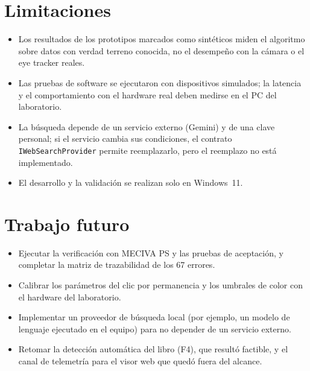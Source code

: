 \section{Limitaciones}

\begin{itemize}
  \item Los resultados de los prototipos marcados como sintéticos miden el algoritmo sobre datos con verdad terreno conocida, no el desempeño con la cámara o el eye tracker reales.
  \item Las pruebas de software se ejecutaron con dispositivos simulados; la latencia y el comportamiento con el hardware real deben medirse en el PC del laboratorio.
  \item La búsqueda depende de un servicio externo (Gemini) y de una clave personal; si el servicio cambia sus condiciones, el contrato \texttt{IWebSearchProvider} permite reemplazarlo, pero el reemplazo no está implementado.
  \item El desarrollo y la validación se realizan solo en Windows~11.
\end{itemize}

\section{Trabajo futuro}

\begin{itemize}
  \item Ejecutar la verificación con MECIVA PS y las pruebas de aceptación, y completar la matriz de trazabilidad de los 67 errores.
  \item Calibrar los parámetros del clic por permanencia y los umbrales de color con el hardware del laboratorio.
  \item Implementar un proveedor de búsqueda local (por ejemplo, un modelo de lenguaje ejecutado en el equipo) para no depender de un servicio externo.
  \item Retomar la detección automática del libro (F4), que resultó factible, y el canal de telemetría para el visor web que quedó fuera del alcance.
\end{itemize}
